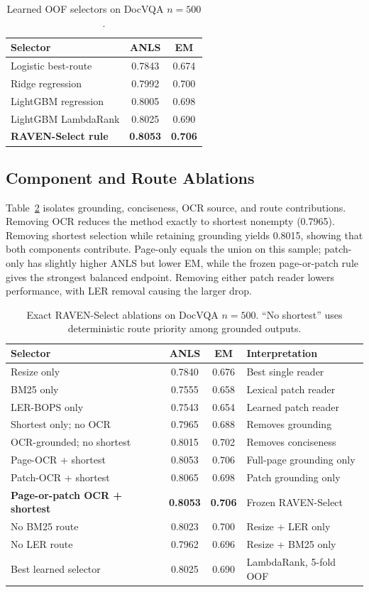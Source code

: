 \documentclass[journal]{IEEEtran}
\begin{document}
\begin{table}[t]
\centering
\caption{Learned OOF selectors on DocVQA $n=500$.}
\label{tab:learned}
\begin{tabular}{lcc}
\toprule
Selector & ANLS & EM\\
\midrule
Logistic best-route & 0.7843 & 0.674\\
Ridge regression & 0.7992 & 0.700\\
LightGBM regression & 0.8005 & 0.698\\
LightGBM LambdaRank & 0.8025 & 0.690\\
\textbf{RAVEN-Select rule} & \textbf{0.8053} & \textbf{0.706}\\
\bottomrule
\end{tabular}
\end{table}

\subsection{Component and Route Ablations}
Table~\ref{tab:ablation} isolates grounding, conciseness, OCR source, and route
contributions.  Removing OCR reduces the method exactly to shortest nonempty
(0.7965).  Removing shortest selection while retaining grounding yields 0.8015,
showing that both components contribute.  Page-only equals the union on this
sample; patch-only has slightly higher ANLS but lower EM, while the frozen
page-or-patch rule gives the strongest balanced endpoint.  Removing either
patch reader lowers performance, with LER removal causing the larger drop.

\begin{table}[t]
\centering
\caption{Exact RAVEN-Select ablations on DocVQA $n=500$. ``No shortest'' uses
deterministic route priority among grounded outputs.}
\label{tab:ablation}
\begin{tabular}{lccp{7.2cm}}
\toprule
Selector & ANLS & EM & Interpretation\\
\midrule
Resize only & 0.7840 & 0.676 & Best single reader\\
BM25 only & 0.7555 & 0.658 & Lexical patch reader\\
LER-BOPS only & 0.7543 & 0.654 & Learned patch reader\\
Shortest only; no OCR & 0.7965 & 0.688 & Removes grounding\\
OCR-grounded; no shortest & 0.8015 & 0.702 & Removes conciseness\\
Page-OCR + shortest & 0.8053 & 0.706 & Full-page grounding only\\
Patch-OCR + shortest & 0.8065 & 0.698 & Patch grounding only\\
\textbf{Page-or-patch OCR + shortest} & \textbf{0.8053} & \textbf{0.706} & Frozen RAVEN-Select\\
No BM25 route & 0.8023 & 0.700 & Resize + LER only\\
No LER route & 0.7962 & 0.696 & Resize + BM25 only\\
Best learned selector & 0.8025 & 0.690 & LambdaRank, 5-fold OOF\\
\bottomrule
\end{tabular}
\end{table}
\end{document}
